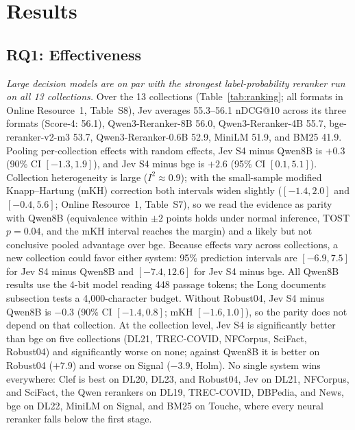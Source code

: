 \section{Results}



\subsection{RQ1: Effectiveness}

\emph{Large decision models are on par with the strongest label-probability reranker run on all 13 collections.}
Over the 13 collections (Table~\ref{tab:ranking}; all formats in Online Resource~1, Table~S8), Jev averages 55.3--56.1 nDCG@10 across its three formats (Score-4: 56.1), Qwen3-Reranker-8B 56.0, Qwen3-Reranker-4B 55.7, bge-reranker-v2-m3 53.7, Qwen3-Reranker-0.6B 52.9, MiniLM 51.9, and BM25 41.9.
Pooling per-collection effects with random effects, Jev S4 minus Qwen8B is $+0.3$ (90\% CI $[-1.3,1.9]$), and Jev S4 minus bge is $+2.6$ (95\% CI $[0.1,5.1]$). Collection heterogeneity is large ($I^2\approx0.9$); with the small-sample modified Knapp--Hartung (mKH) correction both intervals widen slightly ($[-1.4,2.0]$ and $[-0.4,5.6]$; Online Resource~1, Table~S7), so we read the evidence as parity with Qwen8B (equivalence within $\pm2$ points holds under normal inference, TOST $p=0.04$, and the mKH interval reaches the margin) and a likely but not conclusive pooled advantage over bge. Because effects vary across collections, a new collection could favor either system: 95\% prediction intervals are $[-6.9,7.5]$ for Jev S4 minus Qwen8B and $[-7.4,12.6]$ for Jev S4 minus bge. All Qwen8B results use the 4-bit model reading 448 passage tokens; the Long documents subsection tests a 4{,}000-character budget. Without Robust04, Jev S4 minus Qwen8B is $-0.3$ (90\% CI $[-1.4,0.8]$; mKH $[-1.6,1.0]$), so the parity does not depend on that collection.
At the collection level, Jev S4 is significantly better than bge on five collections (DL21, TREC-COVID, NFCorpus, SciFact, Robust04) and significantly worse on none; against Qwen8B it is better on Robust04 ($+7.9$) and worse on Signal ($-3.9$, Holm). No single system wins everywhere: Clef is best on DL20, DL23, and Robust04, Jev on DL21, NFCorpus, and SciFact, the Qwen rerankers on DL19, TREC-COVID, DBPedia, and News, bge on DL22, MiniLM on Signal, and BM25 on Touche, where every neural reranker falls below the first stage.
